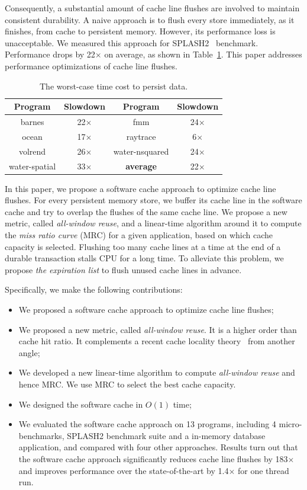\documentclass[preprint,nocopyrightspace,10pt]{sigplanconf}
\begin{document}
Consequently, a substantial amount of cache line flushes are involved to maintain consistent
durability. A naive approach is to flush every store immediately, as it finishes, from cache
to persistent memory. However, its performance loss is unacceptable. We measured this
approach for SPLASH2~\cite{Woo+:ISCA95} benchmark. Performance drops by 22$\times$ on average,
as shown in Table~\ref{tbl:moti}. This paper addresses performance
optimizations of cache line flushes. 

\begin{table}[hbpt]
\small
\centering
\begin{tabular}{c|c|c|c}
\hline
{\bf Program} & {\bf Slowdown} & {\bf Program}& {\bf Slowdown}  \\ \hline
barnes & 22$\times$ & fmm & 24$\times$ \\ \hline
ocean & 17$\times$ & raytrace & 6$\times$  \\ \hline
volrend & 26$\times$ & water-nsquared & 24$\times$ \\ \hline
water-spatial & 33$\times$ & {\bf average} & 22$\times$  \\\hline
\end{tabular}
\caption{The worst-case time cost to persist data.}
\label{tbl:moti}
\end{table}

In this paper, we propose a software cache approach to optimize cache
line flushes. For every persistent memory store, we buffer its cache
line in the software cache and try to overlap the flushes of the same
cache line. We propose a new metric, called \emph{all-window reuse},
and a linear-time algorithm around it to compute the \emph{miss ratio
curve} (MRC) for a given application, based on which cache capacity is
selected.  Flushing too many cache lines at a time at the end of a
durable transaction stalls CPU for a long time. To alleviate this
problem, we propose \emph{the expiration list} to flush unused cache
lines in advance.

Specifically, we make the following contributions:
\begin{itemize}
\item We proposed a software cache approach to optimize cache line
flushes;
\item We proposed a new metric, called \emph{all-window reuse}. It is
a higher order than cache hit ratio. It complements a recent cache
locality theory~\cite{Xiang+:ASPLOS13} from another angle;
\item We developed a new linear-time algorithm to compute
\emph{all-window reuse} and hence MRC. We use MRC to select the best
cache capacity.
\item We designed the software cache in $O(1)$ time; 
\item We evaluated the software cache approach on 13 programs,
including 4 micro-benchmarks, SPLASH2 benchmark suite and a in-memory
database application, and compared with four other approaches. Results
turn out that the software cache approach significantly reduces cache
line flushes by 183$\times$ and improves performance over the
state-of-the-art by 1.4$\times$ for one thread run.
\end{itemize}
\end{document}
